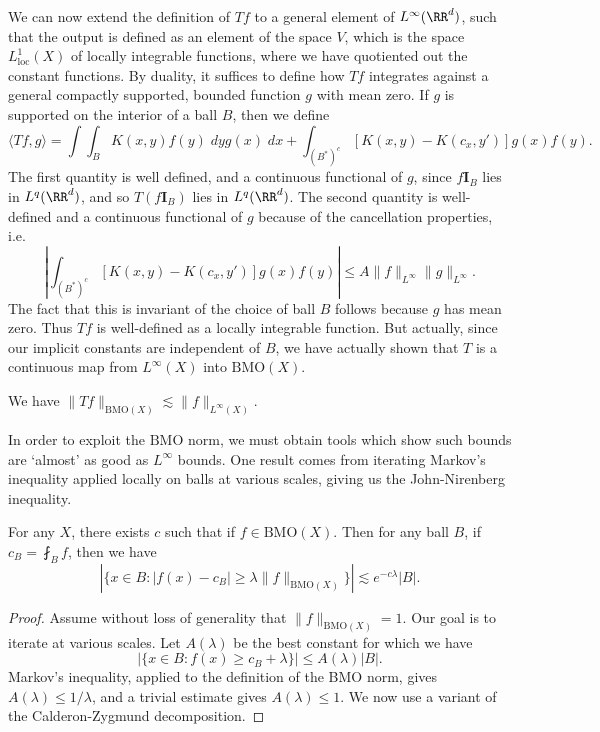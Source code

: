 We can now extend the definition of $Tf$ to a general element of $L^\infty(\RR^d)$, such that the output is defined as an element of the space $V$, which is the space $L^1_{\text{loc}}(X)$ of locally integrable functions, where we have quotiented out the constant functions. By duality, it suffices to define how $Tf$ integrates against a general compactly supported, bounded function $g$ with mean zero. If $g$ is supported on the interior of a ball $B$, then we define
%
\[ \langle Tf, g \rangle = \int \int_B K(x,y) f(y)\; dy g(x)\; dx + \int_{(B^*)^c} [K(x,y) - K(c_x,y')] g(x) f(y). \]
%
The first quantity is well defined, and a continuous functional of $g$, since $f \mathbf{I}_B$ lies in $L^q(\RR^d)$, and so $T(f \mathbf{I}_B)$ lies in $L^q(\RR^d)$. The second quantity is well-defined and a continuous functional of $g$ because of the cancellation properties, i.e.
%
\[ \left| \int_{(B^*)^c} [K(x,y) - K(c_x,y')] g(x) f(y) \right| \leq A \| f \|_{L^\infty} \| g \|_{L^\infty}. \]
%
The fact that this is invariant of the choice of ball $B$ follows because $g$ has mean zero. Thus $Tf$ is well-defined as a locally integrable function. But actually, since our implicit constants are independent of $B$, we have actually shown that $T$ is a continuous map from $L^\infty(X)$ into $\text{BMO}(X)$.

\begin{theorem}
    We have $\| Tf \|_{\text{BMO}(X)} \lesssim \| f \|_{L^\infty(X)}$.
\end{theorem}

In order to exploit the $\text{BMO}$ norm, we must obtain tools which show such bounds are `almost' as good as $L^\infty$ bounds. One result comes from iterating Markov's inequality applied locally on balls at various scales, giving us the John-Nirenberg inequality.

\begin{theorem}
    For any $X$, there exists $c$ such that if $f \in \text{BMO}(X)$. Then for any ball $B$, if $c_B = \fint_B f$, then we have
    \[ |\{ x \in B: \left| f(x) - c_B \right| \geq \lambda \| f \|_{\text{BMO}(X)} \}| \lesssim e^{-c \lambda} |B|. \]
\end{theorem}
\begin{proof}
    Assume without loss of generality that $\| f \|_{\text{BMO}(X)} = 1$. Our goal is to iterate at various scales. Let $A(\lambda)$ be the best constant for which we have
    \[ |\{ x \in B: f(x) \geq c_B + \lambda \}| \leq A(\lambda) |B|. \]
    Markov's inequality, applied to the definition of the BMO norm, gives $A(\lambda) \leq 1/\lambda$, and a trivial estimate gives $A(\lambda) \leq 1$. We now use a variant of the Calderon-Zygmund decomposition.
\end{proof}






